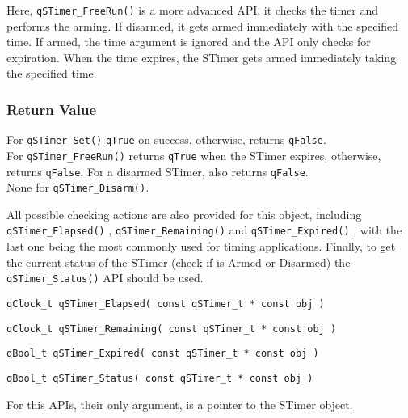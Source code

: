 Here, \lstinline{qSTimer_FreeRun()} is a more advanced API, it checks the timer and performs the arming. If disarmed, it gets armed immediately with the specified time. If armed, the time argument is ignored and the API only checks for expiration. When the time expires, the STimer gets armed immediately taking the specified time.

\subsubsection*{Return Value}
For \lstinline{qSTimer_Set()} \lstinline{qTrue} on success, otherwise, returns \lstinline{qFalse}.\\
For \lstinline{qSTimer_FreeRun()} returns \lstinline{qTrue} when the STimer expires, otherwise, returns \lstinline{qFalse}. For a disarmed STimer, also returns \lstinline{qFalse}. \\
None for \lstinline{qSTimer_Disarm()}.

\noindent\hrulefill
\newline
All possible checking actions are also provided for this object, including \lstinline{qSTimer_Elapsed()} , \lstinline{qSTimer_Remaining()}  and \lstinline{qSTimer_Expired()} , with the last one being the most commonly used for timing applications.
Finally, to get the current status of the STimer (check if is Armed or Disarmed) the \lstinline{qSTimer_Status()}  API should be used. \\

\begin{lstlisting}[style=CStyle]
qClock_t qSTimer_Elapsed( const qSTimer_t * const obj )
\end{lstlisting}

\begin{lstlisting}[style=CStyle]
qClock_t qSTimer_Remaining( const qSTimer_t * const obj )
\end{lstlisting}

\begin{lstlisting}[style=CStyle]
qBool_t qSTimer_Expired( const qSTimer_t * const obj )
\end{lstlisting}

\begin{lstlisting}[style=CStyle]
qBool_t qSTimer_Status( const qSTimer_t * const obj )
\end{lstlisting}

For this APIs, their only argument, is a pointer to the STimer object.

